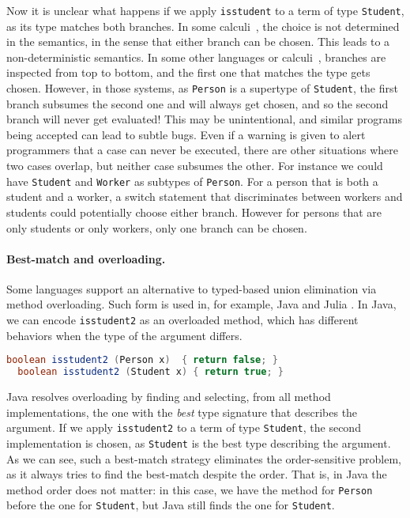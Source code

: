 \noindent Now it is unclear what happens if we apply \lstinline{isstudent}
to a term of type \lstinline{Student}, as its type matches both branches.
In some calculi~\citep{dunfield2014elaborating}, the choice is not determined in
the semantics, in the sense that either branch can be chosen. This leads to a
non-deterministic semantics. In some other languages or
calculi~\citep{castagna:settheoretic}, branches are inspected from top to
bottom, and the first one that matches the type gets chosen. However, in those
systems, as \lstinline{Person} is a supertype of \lstinline{Student}, the first
branch subsumes the second one and will always get chosen, and so the second
branch will never get evaluated! This may be unintentional, and similar
programs being accepted can lead to subtle bugs. Even if a warning is
given to alert programmers that a case can never be executed, there are
other situations where two cases overlap, but neither case subsumes the other.
For instance we could have \lstinline{Student} and \lstinline{Worker} as
subtypes of \lstinline{Person}. For a person that is both a student and a
worker, a switch statement that discriminates between workers and students could
potentially choose either branch. However for persons that are only students or
only workers, only one branch can be chosen.

\paragraph*{Best-match and overloading.}
Some languages support an alternative to typed-based union elimination via method
overloading. Such form is used in, for example, Java \citep{javadoc} and
Julia \citep{zappa2018julia}. In Java, we
can encode \lstinline{isstudent2} as an overloaded method, which has different
behaviors when the type of the argument differs.

\begin{lstlisting}[language=Scala]
  boolean isstudent2 (Person x)  { return false; }
  boolean isstudent2 (Student x) { return true; }
\end{lstlisting}

\noindent Java resolves overloading by finding and selecting, from all method implementations,
the one with the \textit{best} type signature that describes the argument. If we
apply \lstinline{isstudent2} to a term of type \lstinline{Student}, the second
implementation is chosen, as \lstinline{Student} is the best type describing the
argument. As we can see, such a best-match strategy eliminates the
order-sensitive problem, as it always tries to find the best-match despite
the order. That is, in Java the method order does not matter:
in this case,
we have the method for \lstinline{Person} before the one for \lstinline{Student}, but Java still finds
the one for \lstinline{Student}.

